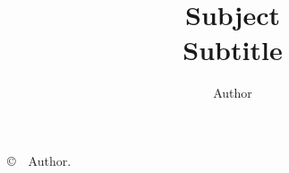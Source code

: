 

\newcommand{\mytitle}{Subject}
\newcommand{\mysubtitle}{Subtitle}
\newcommand{\myauthor}{Author}


\frontmatter
\title{\mytitle \\[0.5em] \large \mysubtitle}
\author{\myauthor}
\date{\the\year}
\maketitle
{\vspace*{\fill}\raggedright \copyright\ \the\year\ \myauthor.}
\tableofcontents
\mainmatter


